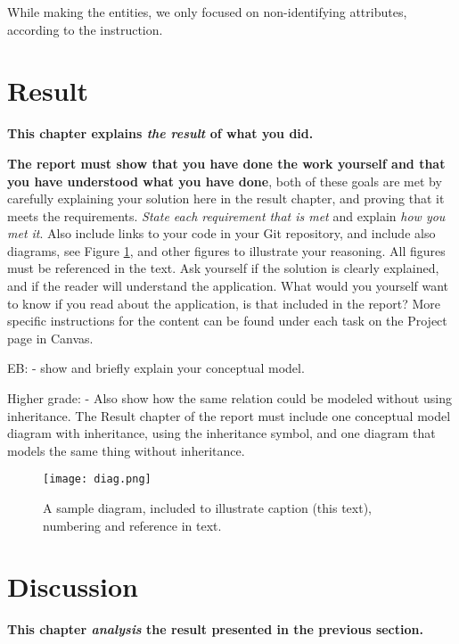 \documentclass[a4paper]{scrartcl}
\begin{document}
While making the entities, we only focused on non-identifying attributes, according to the instruction. 


\section{Result}

\textbf{This chapter explains \textit{the result} of what you did.}

\textbf{The report must show that you have done the work yourself and that you have understood what you have done}, both of these goals are met by carefully explaining your solution here in the result chapter, and proving that it meets the requirements. \textit{State each requirement that is met} and explain \textit{how you met it}. Also include links to your code in your Git repository, and include also diagrams, see Figure \ref{fig:diag}, and other figures to illustrate your reasoning. All figures must be referenced in the text. Ask yourself if the solution is clearly explained, and if the reader will understand the application. What would you yourself want to know if you read about the application, is that included in the report? More specific instructions for the content can be found under each task on the Project page in Canvas. 

EB:
- show and briefly explain your conceptual model.

Higher grade: 
- Also show how the same relation could be modeled without using inheritance. The Result chapter of the report must include one conceptual model diagram with inheritance, using the inheritance symbol, and one diagram that models the same thing without inheritance. 


\begin{figure}[h!]
  \begin{center}
    \texttt{[image: diag.png]}
    \caption{A sample diagram, included to illustrate caption (this text), numbering and reference in text.}
    \label{fig:diag}
  \end{center}
\end{figure}

\pagebreak

\section{Discussion}

\textbf{This chapter \textit{analysis} the result presented in the previous section.} 
\end{document}

